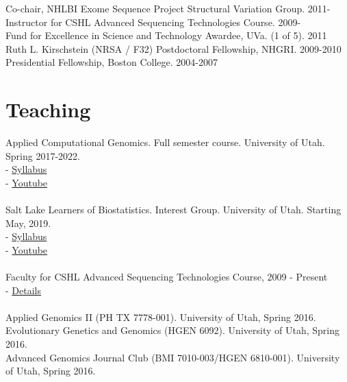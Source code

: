 \documentclass[margin,line]{cv}
\begin{document}
\begin{resume}
    Co-chair, NHLBI Exome Sequence Project Structural Variation Group. 2011-                           \\\vspace{1mm}%
    Instructor for CSHL Advanced Sequencing Technologies Course. 2009-                                 \\\vspace{1mm}%
    Fund for Excellence in Science and Technology Awardee, UVa. (1 of 5). 2011                         \\\vspace{1mm}%
    Ruth L. Kirschstein (NRSA / F32) Postdoctoral Fellowship, NHGRI. 2009-2010                         \\\vspace{1mm}%
    Presidential Fellowship, Boston College. 2004-2007                                                               %

    \section{\mysidestyle Teaching}
    Applied Computational Genomics. Full semester course. University of Utah. Spring 2017-2022. \\
    - \href{https://github.com/quinlan-lab/applied-computational-genomics}{Syllabus} \\
    - \href{https://www.youtube.com/playlist?list=PLCbXw1opqIQeNfF26-wWegdGoCC1aut0P}{Youtube} \\
    \\    
    Salt Lake Learners of Biostatistics. Interest Group. University of Utah. Starting May, 2019. \\
    - \href{https://github.com/quinlan-lab/sllobs-biostats}{Syllabus} \\
    - \href{https://www.youtube.com/playlist?list=PLCbXw1opqIQfqklJIt4UILB6ZMye24GnP}{Youtube} \\  
    \\     
    Faculty for CSHL Advanced Sequencing Technologies Course, 2009 - Present\\
    - \href{https://meetings.cshl.edu/courses.aspx?course=C-SEQTEC}{Details} \\
    \\
    Applied Genomics II (PH TX 7778-001). University of Utah, Spring 2016. \\
    Evolutionary Genetics and Genomics (HGEN 6092). University of Utah, Spring 2016. \\
    Advanced Genomics Journal Club (BMI 7010-003/HGEN 6810-001). University of Utah, Spring 2016. \\


\end{resume}
\end{document}
